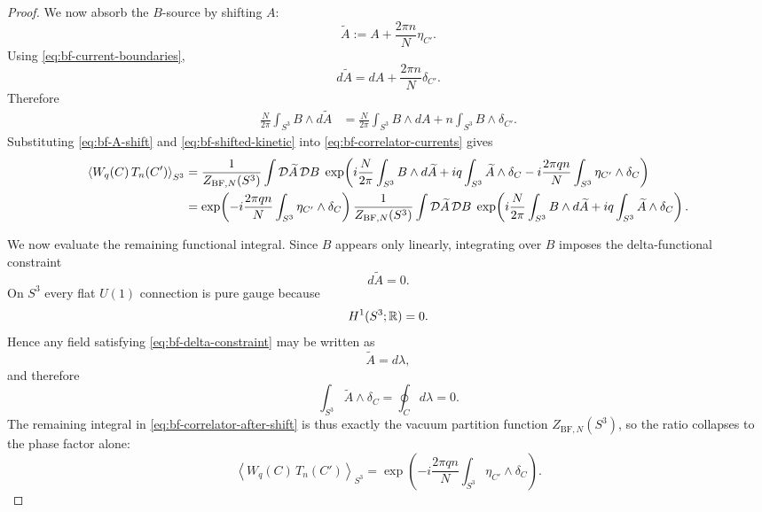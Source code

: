 \begin{proof}
\noindent We now absorb the $B$-source by shifting $A$:
\begin{equation}\label{eq:bf-A-shift}
\widetilde{A}
:=
A+\frac{2\pi n}{N}\eta_{C'}.
\end{equation}
Using \eqref{eq:bf-current-boundaries},
\begin{equation*}
d\widetilde{A}
=
dA+\frac{2\pi n}{N}\delta_{C'}.
\end{equation*}
Therefore
\begin{align}
\frac{N}{2\pi}\int_{S^3} B\wedge d\widetilde{A}
&=
\frac{N}{2\pi}\int_{S^3} B\wedge dA
+
n\int_{S^3} B\wedge \delta_{C'}.
\label{eq:bf-shifted-kinetic}
\end{align}
Substituting \eqref{eq:bf-A-shift} and \eqref{eq:bf-shifted-kinetic} into \eqref{eq:bf-correlator-currents} gives
\begin{align}
\left\langle W_q(C)\,T_n(C')\right\rangle_{S^3}
&=
\frac{1}{Z_{\mathrm{BF},N}(S^3)}
\int \mathcal{D}\widetilde{A}\,\mathcal{D}B\;
\exp\!\left(
i\frac{N}{2\pi}\int_{S^3} B\wedge d\widetilde{A}
+
iq\int_{S^3} \widetilde{A}\wedge \delta_C
-i\frac{2\pi q n}{N}\int_{S^3} \eta_{C'}\wedge \delta_C
\right) \notag\\
&=
\exp\!\left(
-i\frac{2\pi q n}{N}\int_{S^3} \eta_{C'}\wedge \delta_C
\right)
\frac{1}{Z_{\mathrm{BF},N}(S^3)}
\int \mathcal{D}\widetilde{A}\,\mathcal{D}B\;
\exp\!\left(
i\frac{N}{2\pi}\int_{S^3} B\wedge d\widetilde{A}
+
iq\int_{S^3} \widetilde{A}\wedge \delta_C
\right).
\label{eq:bf-correlator-after-shift}
\end{align}

\medskip

\noindent We now evaluate the remaining functional integral. Since $B$ appears only linearly, integrating over $B$ imposes the delta-functional constraint
\begin{equation}\label{eq:bf-delta-constraint}
d\widetilde{A}=0.
\end{equation}
On $S^3$ every flat $U(1)$ connection is pure gauge because
\begin{equation*}
H^1(S^3;\mathbb{R})=0.
\end{equation*}
Hence any field satisfying \eqref{eq:bf-delta-constraint} may be written as
\begin{equation*}
\widetilde{A}=d\lambda,
\end{equation*}
and therefore
\begin{equation*}
\int_{S^3}\widetilde{A}\wedge \delta_C
=
\oint_C d\lambda
=
0.
\end{equation*}
The remaining integral in \eqref{eq:bf-correlator-after-shift} is thus exactly the vacuum partition function $Z_{\mathrm{BF},N}(S^3)$, so the ratio collapses to the phase factor alone:
\begin{equation}\label{eq:bf-correlator-phase-only}
\left\langle W_q(C)\,T_n(C')\right\rangle_{S^3}
=
\exp\!\left(
-i\frac{2\pi q n}{N}\int_{S^3} \eta_{C'}\wedge \delta_C
\right).
\end{equation}


\end{proof}

